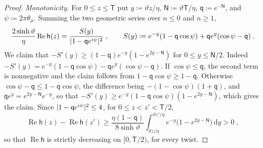 \documentclass[11pt]{preprint}
\newcommand{\dd}{\mathrm{d}}
\DeclarePairedDelimiter{\abs}{\lvert}{\rvert}
\numberwithin{equation}{section}
\theoremstyle{definition}
\theoremstyle{remark}
\theoremstyle{plain}
\begin{document}
\begin{proof}
\emph{Monotonicity.} For $0 \leq z \leq \mathsf T$ put $y \coloneqq \vartheta z/\eta$, $\mathsf N \coloneqq \vartheta\mathsf T/\eta$, $\mathsf q \coloneqq e^{-\mathsf N}$, and $\psi \coloneqq 2\pi\theta_\mu$. Summing the two geometric series over $n \leq 0$ and $n \geq 1$,
\begin{equation}\label{eq:resolvent-real-part}
    \frac{2\sinh\vartheta}{\eta}\operatorname{Re}\mathsf h(z) = \frac{S(y)}{\abs{1 - \mathsf qe^{i\psi}}^2}\;,
    \qquad
    S(y) \coloneqq e^{-y}(1 - \mathsf q\cos\psi) + \mathsf qe^{y}(\cos\psi - \mathsf q)\;.
\end{equation}
We claim that $-S'(y) \geq (1 - \mathsf q)e^{-y}(1 - e^{2y - \mathsf N})$ for $0 \leq y \leq \mathsf N/2$. Indeed $-S'(y) = e^{-y}(1 - \mathsf q\cos\psi) - \mathsf qe^{y}(\cos\psi - \mathsf q)$. If $\cos\psi \leq \mathsf q$, the second term is nonnegative and the claim follows from $1 - \mathsf q\cos\psi \geq 1 - \mathsf q$. Otherwise $\cos\psi - \mathsf q \leq 1 - \mathsf q\cos\psi$, the difference being $-(1 - \cos\psi)(1 + \mathsf q)$, and $\mathsf qe^y = e^{2y - \mathsf N}e^{-y}$, so that $-S'(y) \geq e^{-y}(1 - \mathsf q\cos\psi)(1 - e^{2y - \mathsf N})$, which gives the claim. Since $\abs{1 - \mathsf qe^{i\psi}}^2 \leq 4$, for $0 \leq z < z' < \mathsf T/2$,
\begin{equation}\label{eq:resolvent-decrease}
    \operatorname{Re}\mathsf h(z) - \operatorname{Re}\mathsf h(z') \geq \frac{\eta(1 - \mathsf q)}{8\sinh\vartheta}\int_{\vartheta z/\eta}^{\vartheta z'/\eta}e^{-y}\bigl(1 - e^{2y - \mathsf N}\bigr)\,\dd y > 0\;,
\end{equation}
so that $\operatorname{Re}\mathsf h$ is strictly decreasing on $[0, \mathsf T/2)$, for every twist.


\end{proof}
\end{document}
